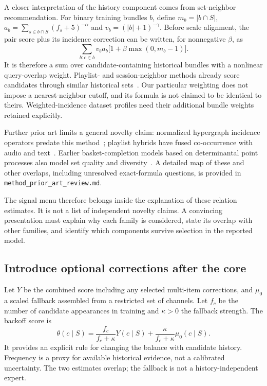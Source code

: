 \documentclass[11pt,a4paper]{article}
\begin{document}
A closer interpretation of the history component comes from set-neighbor
recommendation. For binary training bundles $b$, define $m_b=|b\cap S|$,
$a_b=\sum_{s\in b\cap S}(f_s+5)^{-\alpha}$ and
$v_b=(|b|+1)^{-\gamma}$. Before scale alignment, the pair score plus its
incidence correction can be written, for nonnegative $\beta$, as
\[
 \sum_{b:c\in b} v_b a_b\bigl[1+\beta\max(0,m_b-1)\bigr].
\]
It is therefore a sum over candidate-containing historical bundles with a
nonlinear query-overlap weight. Playlist- and session-neighbor methods already
score candidates through similar historical sets~\cite{bonnin,ludewig}. Our
particular weighting does not impose a nearest-neighbor cutoff, and its formula
is not claimed to be identical to theirs. Weighted-incidence dataset profiles
need their additional bundle weights retained explicitly.

Further prior art limits a general novelty claim: normalized hypergraph
incidence operators predate this method~\cite{zhou}; playlist hybrids have fused
co-occurrence with audio and text~\cite{ferraro}. Earlier basket-completion models based on determinantal point processes also
model set quality and diversity~\cite{gartrell,warlop}. A detailed map of these and
other overlaps, including unresolved exact-formula questions, is provided in
\texttt{method\_prior\_art\_review.md}.

The signal menu therefore belongs inside the explanation of these relation estimates.
It is not a list of independent novelty claims. A convincing presentation must
explain why each family is considered, state its overlap with other families, and
identify which components survive selection in the reported model.

\subsection{Introduce optional corrections after the core}
Let $Y$ be the combined score including any selected multi-item corrections, and
$\mu_0$ a scaled fallback assembled from a restricted set of channels. Let $f_c$ be
the number of candidate appearances in training and $\kappa>0$ the fallback strength.
The backoff score is
\[
 \theta(c\mid S)=\frac{f_c}{f_c+\kappa}Y(c\mid S)
              +\frac{\kappa}{f_c+\kappa}\mu_0(c\mid S).
\]
It provides an explicit rule for changing the balance with candidate history.
Frequency is a proxy for available historical evidence, not a calibrated uncertainty.
The two estimates overlap; the fallback is not a history-independent expert.
\end{document}
